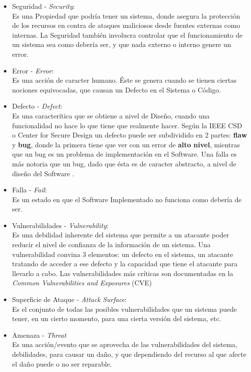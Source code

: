 \begin{itemize}
	\item Seguridad - \textit{Security}:
		\\Es una Propiedad que podría tener un sistema, donde asegura la protección de los recursos en contra de ataques maliciosos desde fuentes externas como internas. La Seguridad también involucra controlar que el funcionamiento de un sistema sea como debería ser, y que nada externo o interno genere un error.
	\item Error - \textit{Error}:
		\\Es una acción de caracter humano. Éste se genera cuando se tienen ciertas nociones equivocadas, que causan un Defecto en el Sistema o Código.
	\item Defecto  - \textit{Defect}:
		\\Es una caracterítica que se obtiene a nivel de Diseño, cuando una funcionalidad no hace lo que tiene que realmente hacer. Según la IEEE CSD o Center for Secure Design un defecto puede ser subdividido en 2 partes: \textbf{flaw} y \textbf{bug}, donde la primera tiene que ver con un error de \textbf{alto nivel}, mientras que un bug es un problema de implementación en el Software. Una falla es más notoria que un bug, dado que ésta es de caracter abstracto, a nivel de diseño del Software \cite{ieeecsd}.
	\item Falla - \textit{Fail}:
		\\Es un estado en que el Software Implementado no funciona como debería de ser.
	\item Vulnerabilidades - \textit{Vulnerability}:
		\\Es una debilidad inherente del sistema que permite a un atacante poder reducir el nivel de confianza de la información de un sistema. Una vulnerabilidad convina 3 elementos: un defecto en el sistema, un atacante tratando de acceder a ese defecto y la capacidad que tiene el atacante para llevarlo a cabo. Las vulnerabilidades más críticas son documentadas en la \textit{Common Vulnerabilities and Exposures} (CVE) \cite{cve}  
	\item Superficie de Ataque - \textit{Attack Surface}:
		\\Es el conjunto de todas las posibles vulnerabilidades que un sistema puede tener, en un cierto momento, para una cierta versión del sistema, etc.
	\item Amenaza - \textit{Threat}
		\\Es una acción/evento que se aprovecha de las vulnerabilidades del sistema, debilidades, para causar un daño, y que dependiendo del recurso al que afecte el daño puede o no ser reparable.

\end{itemize}
